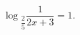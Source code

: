 \begin{ex}[type=equation]
	\begin{condition}
		$\log$\tiny$_{\dfrac{2}{5}}$\normalsize$\dfrac{1}{2x + 3} = 1.$
	\end{condition}
\end{ex}